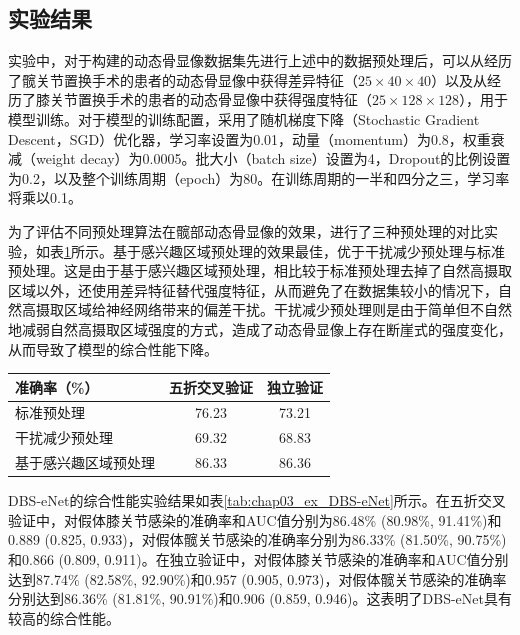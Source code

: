 \subsection{实验结果}

实验中，对于构建的动态骨显像数据集先进行上述中的数据预处理后，可以从经历了髋关节置换手术的患者的动态骨显像中获得差异特征（\(25\times40\times40\)）以及从经历了膝关节置换手术的患者的动态骨显像中获得强度特征（\(25\times128\times128\)），用于模型训练。对于模型的训练配置，采用了随机梯度下降（Stochastic Gradient Descent，SGD）优化器，学习率设置为0.01，动量（momentum）为0.8，权重衰减（weight decay）为0.0005。批大小（batch size）设置为4，Dropout的比例设置为0.2，以及整个训练周期（epoch）为80。在训练周期的一半和四分之三，学习率将乘以0.1。

为了评估不同预处理算法在髋部动态骨显像的效果，进行了三种预处理的对比实验，如表\ref{tab:chap03_experiment_pre}所示。基于感兴趣区域预处理的效果最佳，优于干扰减少预处理与标准预处理。这是由于基于感兴趣区域预处理，相比较于标准预处理去掉了自然高摄取区域以外，还使用差异特征替代强度特征，从而避免了在数据集较小的情况下，自然高摄取区域给神经网络带来的偏差干扰。干扰减少预处理则是由于简单但不自然地减弱自然高摄取区域强度的方式，造成了动态骨显像上存在断崖式的强度变化，从而导致了模型的综合性能下降。

\begin{table}[htbp]
  \centering
  \begin{tabular}{lcc}
    \toprule
    准确率（\%）         & 五折交叉验证 & 独立验证 \\
    \midrule
    标准预处理           & 76.23        & 73.21    \\
    干扰减少预处理       & 69.32        & 68.83    \\
    基于感兴趣区域预处理 & 86.33        & 86.36    \\
    \bottomrule
  \end{tabular}
  \label{tab:chap03_experiment_pre}
\end{table}

DBS-eNet的综合性能实验结果如表\ref{tab:chap03_ex_DBS-eNet}所示。在五折交叉验证中，对假体膝关节感染的准确率和AUC值分别为86.48\% (80.98\%, 91.41\%)和0.889 (0.825, 0.933)，对假体髋关节感染的准确率分别为86.33\% (81.50\%, 90.75\%)和0.866 (0.809, 0.911)。在独立验证中，对假体膝关节感染的准确率和AUC值分别达到87.74\% (82.58\%, 92.90\%)和0.957 (0.905, 0.973)，对假体髋关节感染的准确率分别达到86.36\% (81.81\%, 90.91\%)和0.906 (0.859, 0.946)。这表明了DBS-eNet具有较高的综合性能。

